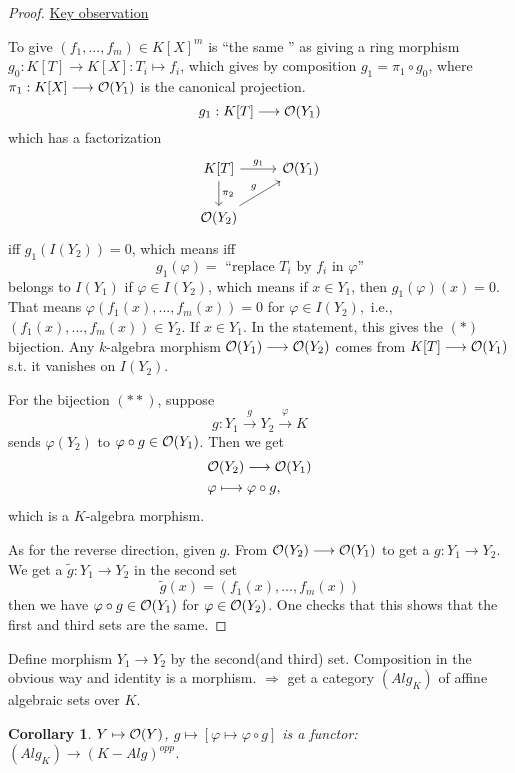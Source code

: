 \documentclass[11pt]{article}
\newtheorem{cor}[thm]{Corollary}
\newcommand{\calo}{{\cal O}}
\newcommand{\Lrta}{\Longrightarrow}
\newcommand{\lrta}{\longrightarrow}
\begin{document}
	\begin{proof}
		\underline{Key observation}
		
		To give $(f_1,...,f_m)\in K[X]^m$ is ``the same '' as giving a ring morphism $g_0:K[T]\lrta K[X]: T_i\mapsto f_i$, which gives by composition $g_1=\pi_1\circ g_0$, where $\pi_1: K[X]\lrta \calo(Y_1)$ is the canonical projection.
		$$
		g_1: K[T]\lrta \calo(Y_1)
		$$
		which has a factorization
		\[
		\begin{tikzcd}
		K[T] \arrow[r,"g_1"] \arrow[d,"\pi_2"]  & \calo(Y_1)  \\
		\calo(Y_2) \arrow[ur,"g"] & 
		\end{tikzcd}
		\]
		iff $g_1(I(Y_2))=0$, which means iff 
		$$
		g_1(\varphi)=\text{ ``replace $T_i$ by $f_i$ in $\varphi$''}
		$$
		belongs to $I(Y_1)$ if $\varphi\in I(Y_2)$, which means if $x\in Y_1$, then $g_1(\varphi)(x)=0$. That means $\varphi(f_1(x),...,f_m(x))=0$ for $\varphi\in I(Y_2),$ i.e., $(f_1(x),...,f_m(x))\in Y_2$. If $x\in Y_1$. In the statement, this gives the $(*)$ bijection. Any $k$-algebra morphism $\calo(Y_1)\lrta\calo(Y_2)$  comes from $K[T]\lrta \calo(Y_1)$ s.t. it vanishes on $I(Y_2)$.
		
		
		For the bijection $(**)$, suppose 
		$$
		g:Y_1\overset{g}{\lrta} Y_2\overset{\varphi}{\lrta} K
		$$
		sends $\varphi(Y_2)$ to $\varphi\circ g\in\calo(Y_1)$. Then we get 
		$$
		\begin{aligned}
		& \calo(Y_2)\lrta \calo(Y_1)\\
		&\varphi\longmapsto \varphi\circ g,
		\end{aligned}
		$$
		which is a $K$-algebra morphism.
		
		As for the reverse direction, given $g$. From $\calo(Y_2)\lrta \calo(Y_1)$ to get a $g:Y_1\lrta Y_2$. We get a $\tilde{g}:Y_1\lrta Y_2$ in the second set
		$$
		\tilde{g}(x)=(f_1(x),...,f_m(x))
		$$
		then we have $\varphi\circ g\in\calo(Y_1)$ for $\varphi\in \calo(Y_2)$. One checks that this shows that the first and third sets are the same.
	\end{proof}
	
	Define morphism $Y_1\lrta Y_2$ by the second(and third) set.  Composition in the obvious way and identity is a morphism.
	$\Lrta$ get a category $(Alg_K)$ of affine algebraic sets over $K$.
	
	\begin{cor}
		$Y\mapsto \calo(Y)$, $g\mapsto [\varphi\mapsto \varphi\circ g]$ is a functor: $(Alg_K)\lrta (K-Alg)^{opp}$.
	\end{cor}
	
\end{document}
